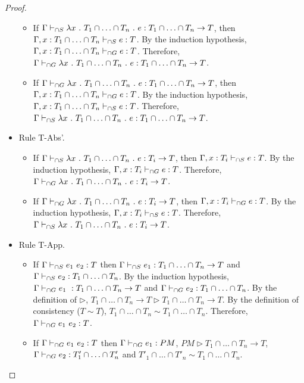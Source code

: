 \documentclass[a4paper]{article}
\begin{document}
\begin{proof}
\begin{itemize}
\begin{itemize}
        \item If $\Gamma \sits \lambda x\ .\ T_1 \cap \ldots \cap T_n\ .\ e : T_1 \cap \ldots \cap T_n \rightarrow T$, then $\Gamma, x : T_1 \cap \ldots \cap T_n \vdash_{\cap S} e : T$.
        By the induction hypothesis, $\Gamma, x : T_1 \cap \ldots \cap T_n \vdash_{\cap G} e : T$.
        Therefore, $\Gamma \gits \lambda x\ .\ T_1 \cap \ldots \cap T_n\ .\ e : T_1 \cap \ldots \cap T_n \rightarrow T$.
        \item If $\Gamma \gits \lambda x\ .\ T_1 \cap \ldots \cap T_n\ .\ e : T_1 \cap \ldots \cap T_n \rightarrow T$, then $\Gamma, x : T_1 \cap \ldots \cap T_n \vdash_{\cap G} e : T$.
        By the induction hypothesis, $\Gamma, x : T_1 \cap \ldots \cap T_n \vdash_{\cap S} e : T$.
        Therefore, $\Gamma \sits \lambda x\ .\ T_1 \cap \ldots \cap T_n\ .\ e : T_1 \cap \ldots \cap T_n \rightarrow T$.
    \end{itemize}
    \item Rule T-Abs'.
    \begin{itemize}
        \item If $\Gamma \vdash_{\cap S} \lambda x\ .\ T_1 \cap \ldots \cap T_n\ .\ e : T_i \rightarrow T$, then $\Gamma, x : T_i \vdash_{\cap S} e : T$.
        By the induction hypothesis, $\Gamma, x : T_i \vdash_{\cap G} e : T$.
        Therefore, $\Gamma \vdash_{\cap G} \lambda x\ .\ T_1 \cap \ldots \cap T_n\ .\ e : T_i \rightarrow T$.
        \item If $\Gamma \vdash_{\cap G} \lambda x\ .\ T_1 \cap \ldots \cap T_n\ .\ e : T_i \rightarrow T$, then $\Gamma, x : T_i \vdash_{\cap G} e : T$.
        By the induction hypothesis, $\Gamma, x : T_i \vdash_{\cap S} e : T$.
        Therefore, $\Gamma \vdash_{\cap S} \lambda x\ .\ T_1 \cap \ldots \cap T_n\ .\ e : T_i \rightarrow T$.
    \end{itemize}
    \item Rule T-App.
    \begin{itemize}
        \item If $\Gamma \vdash_{\cap S} e_1\ e_2 : T$ then $\Gamma \vdash_{\cap S} e_1 : T_1 \cap \ldots \cap T_n \rightarrow T$ and $\Gamma \vdash_{\cap S} e_2 : T_1 \cap \ldots \cap T_n$.
        By the induction hypothesis, $\Gamma \vdash_{\cap G} e_1\ : T_1 \cap \ldots \cap T_n \rightarrow T$ and $\Gamma \vdash_{\cap G} e_2 : T_1 \cap \ldots \cap T_n$.
        By the definition of $\rhd$, $T_1 \cap \ldots \cap T_n \rightarrow T \rhd T_1 \cap \ldots \cap T_n \rightarrow T$.
        By the definition of consistency ($T \sim T$), $T_1 \cap \ldots \cap T_n \sim T_1 \cap \ldots \cap T_n$.
        Therefore, $\Gamma \vdash_{\cap G} e_1\ e_2 : T$.
        \item If $\Gamma \vdash_{\cap G} e_1\ e_2 : T$ then $\Gamma \vdash_{\cap G} e_1 : PM$, $PM \rhd T_1 \cap \ldots \cap T_n \rightarrow T$, $\Gamma \vdash_{\cap G} e_2 : T'_1 \cap \ldots \cap T'_n$ and $T'_1 \cap \ldots \cap T'_n \sim T_1 \cap \ldots \cap T_n$.

\end{itemize}
\end{itemize}
\end{proof}
\end{document}

